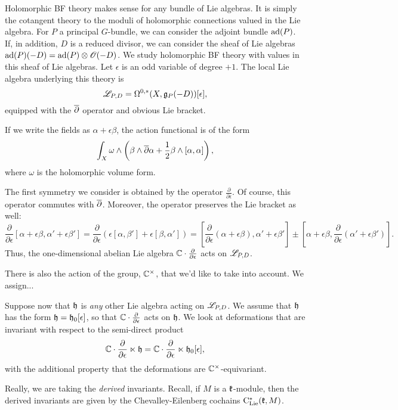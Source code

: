 \documentclass[11pt]{amsart}
\begin{document}
Holomorphic BF theory makes sense for any bundle of Lie algebras. 
It is simply the cotangent theory to the moduli of holomorphic connections valued in the Lie algebra.
For $P$ a principal $G$-bundle, we can consider the adjoint bundle ${\rm ad}(P)$.
If, in addition, $D$ is a reduced divisor, we can consider the sheaf of Lie algebras ${\rm ad}(P)(-D) = {\rm ad}(P) \otimes \mathscr O(-D)$. 
We study holomorphic BF theory with values in this sheaf of Lie algebras.
Let $\epsilon$ is an odd variable of degree $+1$. 
The local Lie algebra underlying this theory is
\[
\mathscr L_{P,D} = \Omega^{0,*}(X , \mathfrak g_P(-D)) [\epsilon],
\]
equipped with the $\overline{\partial}$ operator and obvious Lie bracket. 

If we write the fields as $\alpha + \epsilon \beta$, the action functional is of the form
\[
\int_X \omega \wedge \left(\beta \wedge \overline{\partial} \alpha + \frac{1}{2} \beta \wedge [\alpha,\alpha]\right) ,
\] 
where $\omega$ is the holomorphic volume form. 

The first symmetry we consider is obtained by the operator $\frac{\partial}{\partial \epsilon}$. 
Of course, this operator commutes with $\overline{\partial}$. 
Moreover, the operator preserves the Lie bracket as well:
\[
\frac{\partial}{\partial \epsilon} [\alpha + \epsilon \beta, \alpha' + \epsilon \beta'] = \frac{\partial}{\partial \epsilon} \left(\epsilon [\alpha, \beta'] + \epsilon[\beta, \alpha']\right) = [\frac{\partial}{\partial \epsilon} (\alpha + \epsilon \beta), \alpha' + \epsilon \beta'] \pm [\alpha + \epsilon \beta, \frac{\partial}{\partial \epsilon} (\alpha' + \epsilon \beta')] .
\]
Thus, the one-dimensional abelian Lie algebra $\mathbb C \cdot \frac{\partial}{\partial \epsilon}$ acts on $\mathscr L_{P,D}$. 

There is also the action of the group, $\mathbb C^\times$, that we'd like to take into account. 
We assign...

Suppose now that $\mathfrak h$ is {\em any} other Lie algebra acting on $\mathscr L_{P,D}$. 
We assume that $\mathfrak h$ has the form $\mathfrak h = \mathfrak h_0 [\epsilon]$, so that $\mathbb C \cdot \frac{\partial}{\partial \epsilon}$ acts on $\mathfrak h$. 
We look at deformations that are invariant with respect to the semi-direct product
\[
\mathbb C \cdot \frac{\partial}{\partial \epsilon} \ltimes \mathfrak h = \mathbb C \cdot \frac{\partial}{\partial \epsilon} \ltimes \mathfrak h_0 [\epsilon] ,
\]
with the additional property that the deformations are $\mathbb C^\times$-equivariant. 

\begin{rmk}
Really, we are taking the {\em derived} invariants.
Recall, if $M$ is a $\mathfrak{k}$-module, then the derived invariants are given by the Chevalley-Eilenberg cochains ${\rm C}_{{\rm Lie}}^*(\mathfrak{k}, M)$. 
\end{rmk}
\end{document}
